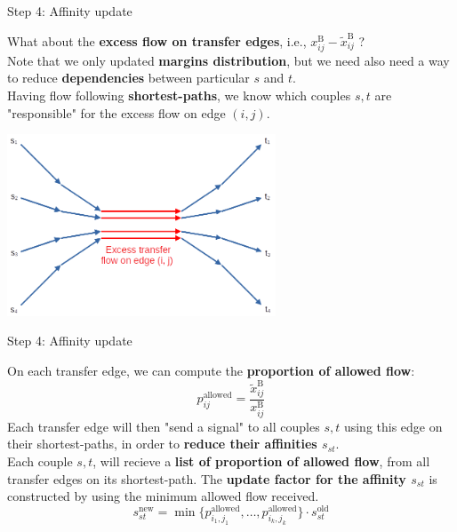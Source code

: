 \documentclass[10pt]{beamer}
\newcommand{\imp}[1]{\textbf{\color{cyan}#1}}
\begin{document}
	
	\begin{frame}{Step 4: Affinity update}
		
		What about the \imp{excess flow on transfer edges}, i.e., $x^\text{B}_{ij} - \widetilde{x}^\text{B}_{ij}$ ? \\
		\vspace{0.4cm}
		Note that we only updated \imp{margins distribution}, but we need also need a way to reduce \imp{dependencies} between particular $s$ and $t$. \\
		\vspace{0.4cm}
		Having flow following \imp{shortest-paths}, we know which couples $s, t$ are "responsible" for the excess flow on edge $(i, j)$.
		\begin{center}
			\includegraphics[width=0.6\textwidth]{img/excess_flow.png}
		\end{center}
	\end{frame}
	
	
	\begin{frame}{Step 4: Affinity update}
		
		On each transfer edge, we can compute the \imp{proportion of allowed flow}:
		$$
			p^\text{allowed}_{ij} = \frac{\widetilde{x}_{ij}^\text{B}}{x_{ij}^\text{B}}
		$$
		Each transfer edge will then "send a signal" to all couples $s,t$ using this edge on their shortest-paths, in order to \imp{reduce their affinities $s_{st}$}. \\
		\vspace{0.4cm}
		Each couple $s,t$, will recieve a \imp{list of proportion of allowed flow}, from all transfer edges on its shortest-path. The \imp{update factor for the affinity $s_{st}$} is constructed by using the minimum allowed flow received.
		$$
			s^\text{new}_{st} = \min\{p^\text{allowed}_{i_1, j_1}, \ldots, p^\text{allowed}_{i_k, j_k} \} \cdot s^\text{old}_{st}
		$$
	\end{frame}
	
\end{document}
